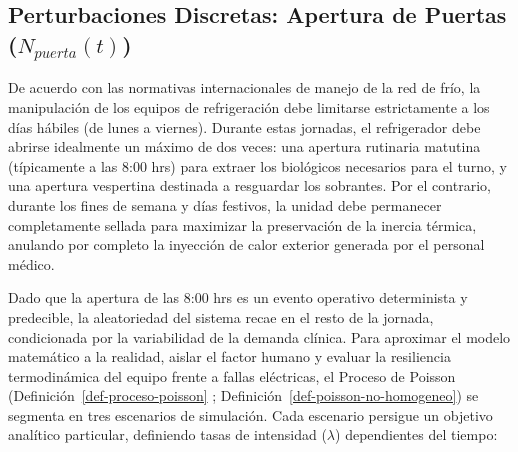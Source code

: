 \documentclass[
  spanish,
  us-letterpaper,
]{scrreprt}
\numberwithin{equation}{section}
\theoremstyle{plain}
\theoremstyle{plain}
\theoremstyle{plain}
\theoremstyle{definition}
\theoremstyle{remark}
\begin{document}
\subsection{\texorpdfstring{Perturbaciones Discretas: Apertura de
Puertas
(\(N_{puerta}(t)\))}{Perturbaciones Discretas: Apertura de Puertas (N\_\{puerta\}(t))}}\label{sec-perturbaciones-discretas}

De acuerdo con las normativas internacionales de manejo de la red de
frío, la manipulación de los equipos de refrigeración debe limitarse
estrictamente a los días hábiles (de lunes a viernes). Durante estas
jornadas, el refrigerador debe abrirse idealmente un máximo de dos
veces: una apertura rutinaria matutina (típicamente a las 8:00 hrs) para
extraer los biológicos necesarios para el turno, y una apertura
vespertina destinada a resguardar los sobrantes. Por el contrario,
durante los fines de semana y días festivos, la unidad debe permanecer
completamente sellada para maximizar la preservación de la inercia
térmica, anulando por completo la inyección de calor exterior generada
por el personal médico.

Dado que la apertura de las 8:00 hrs es un evento operativo determinista
y predecible, la aleatoriedad del sistema recae en el resto de la
jornada, condicionada por la variabilidad de la demanda clínica. Para
aproximar el modelo matemático a la realidad, aislar el factor humano y
evaluar la resiliencia termodinámica del equipo frente a fallas
eléctricas, el Proceso de Poisson (Definición~\ref{def-proceso-poisson}
; Definición~\ref{def-poisson-no-homogeneo}) se segmenta en tres
escenarios de simulación. Cada escenario persigue un objetivo analítico
particular, definiendo tasas de intensidad (\(\lambda\)) dependientes
del tiempo:
\end{document}
